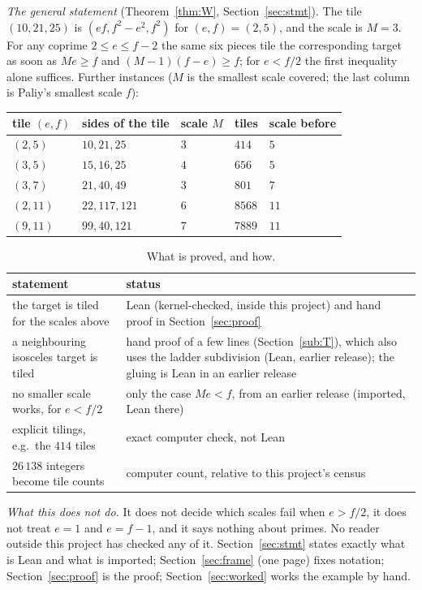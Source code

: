 \documentclass[11pt,reqno]{amsart}
\theoremstyle{plain}
\theoremstyle{definition}
\begin{document}
\emph{The general statement} (Theorem~\ref{thm:W}, Section~\ref{sec:stmt}). The tile $(10,21,25)$ is $(ef,f^2-e^2,f^2)$ for $(e,f)=(2,5)$, and the scale is $M=3$. For any coprime $2\le e\le f-2$ the same six pieces tile the corresponding target as soon as $Me\ge f$ and $(M-1)(f-e)\ge f$; for $e<f/2$ the first inequality alone suffices. Further instances ($M$ is the smallest scale covered; the last column is Paliy's smallest scale $f$):
\begin{center}\small
\begin{tabular}{@{}lllll@{}}
\toprule
tile $(e,f)$ & sides of the tile & scale $M$ & tiles & scale before\\
\midrule
$(2,5)$ & $10,21,25$ & $3$ & $414$ & $5$\\
$(3,5)$ & $15,16,25$ & $4$ & $656$ & $5$\\
$(3,7)$ & $21,40,49$ & $3$ & $801$ & $7$\\
$(2,11)$ & $22,117,121$ & $6$ & $8568$ & $11$\\
$(9,11)$ & $99,40,121$ & $7$ & $7889$ & $11$\\
\bottomrule
\end{tabular}
\end{center}
\begin{table}[ht]
\centering\small
\caption{What is proved, and how.}
\begin{tabular}{@{}p{7.2cm}p{5.3cm}@{}}
\toprule
statement & status\\
\midrule
the target is tiled for the scales above & Lean (kernel-checked, inside this project) and hand proof in Section~\ref{sec:proof}\\
a neighbouring isosceles target is tiled & hand proof of a few lines (Section~\ref{sub:T}), which also uses the ladder subdivision (Lean, earlier release); the gluing is Lean in an earlier release\\
no smaller scale works, for $e<f/2$ & only the case $Me<f$, from an earlier release (imported, Lean there)\\
explicit tilings, e.g.\ the $414$ tiles & exact computer check, not Lean\\
$26\,138$ integers become tile counts & computer count, relative to this project's census\\
\bottomrule
\end{tabular}
\end{table}
\emph{What this does not do.} It does not decide which scales fail when $e>f/2$, it does not treat $e=1$ and $e=f-1$, and it says nothing about primes. No reader outside this project has checked any of it. Section~\ref{sec:stmt} states exactly what is Lean and what is imported; Section~\ref{sec:frame} (one page) fixes notation; Section~\ref{sec:proof} is the proof; Section~\ref{sec:worked} works the example by hand.
\end{document}
